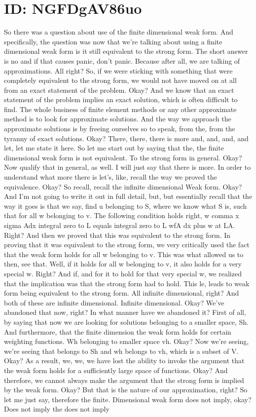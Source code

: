 \documentclass[10pt]{article}
\begin{document}
\section*{ID: NGFDgAV86uo}
So there was a question about use of the finite dimensional weak form. And specifically, the question was now that we're talking about using a finite dimensional weak form is it still equivalent to the strong form. The short answer is no and if that causes panic, don't panic. Because after all, we are talking of approximations. All right? So, if we were sticking with something that were completely equivalent to the strong form, we would not have moved on at all from an exact statement of the problem. Okay? And we know that an exact statement of the problem implies an exact solution, which is often difficult to find. The whole business of finite element methods or any other approximate method is to look for approximate solutions. And the way we approach the approximate solutions is by freeing ourselves so to speak, from the, from the tyranny of exact solutions. Okay? There, there, there is more and, and, and, and let, let me state it here. So let me start out by saying that the, the finite dimensional weak form is not equivalent. To the strong form in general. Okay? Now qualify that in general, as well. I will just say that there is more. In order to understand what more there is let's, like, recall the way we proved the equivalence. Okay? So recall, recall the infinite dimensional Weak form. Okay? And I'm not going to write it out in full detail, but, but essentially recall that the way it goes is that we say, find u belonging to S, where we know what S is, such that for all w belonging to v. The following condition holds right, w comma x sigma Adx integral zero to L equals integral zero to L wfA dx plus w at LA. Right? And then we proved that this was equivalent to the strong form. In proving that it was equivalent to the strong form, we very critically used the fact that the weak form holds for all w belonging to v. This was what allowed us to then, see that. Well, if it holds for all w belonging to v, it also holds for a very special w. Right? And if, and for it to hold for that very special w, we realized that the implication was that the strong form had to hold. This le, leads to weak form being equivalent to the strong form. All infinite dimensional, right? And both of these are infinite dimensional. Infinite dimensional. Okay? We've abandoned that now, right? In what manner have we abandoned it? First of all, by saying that now we are looking for solutions belonging to a smaller space, Sh. And furthermore, that the finite dimension the weak form holds for certain weighting functions. Wh belonging to smaller space vh. Okay? Now we're seeing, we're seeing that belongs to Sh and wh belongs to vh, which is a subset of V. Okay? As a result, we, we, we have lost the ability to invoke the argument that the weak form holds for a sufficiently large space of functions. Okay? And therefore, we cannot always make the argument that the strong form is implied by the weak form. Okay? But that is the nature of our approximation, right? So let me just say, therefore the finite. Dimensional weak form does not imply, okay? Does not imply the does not imply 
\end{document}
